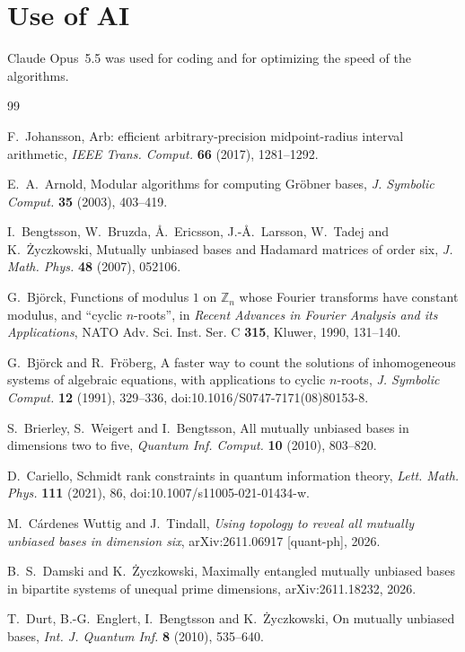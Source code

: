 \documentclass[11pt]{article}
\theoremstyle{definition}
\theoremstyle{remark}
\begin{document}
\section*{Use of AI}
Claude Opus~5.5 was used for coding and for optimizing the speed of the algorithms.

\begin{thebibliography}{99}

 F.~Johansson, Arb: efficient arbitrary-precision midpoint-radius interval arithmetic, \emph{IEEE Trans.
  Comput.} \textbf{66} (2017), 1281--1292.

 E.~A.~Arnold, Modular algorithms for computing Gr\"obner bases, \emph{J. Symbolic Comput.}
  \textbf{35} (2003), 403--419.

 I.~Bengtsson, W.~Bruzda, \AA.~Ericsson, J.-\AA.~Larsson, W.~Tadej and K.~\.Zyczkowski, Mutually
  unbiased bases and Hadamard matrices of order six, \emph{J. Math. Phys.} \textbf{48} (2007), 052106.

 G.~Bj\"orck, Functions of modulus $1$ on $\mathbb Z_n$ whose Fourier transforms have constant
  modulus, and ``cyclic $n$-roots'', in \emph{Recent Advances in Fourier Analysis and its Applications}, NATO Adv. Sci.
  Inst. Ser. C \textbf{315}, Kluwer, 1990, 131--140.

 G.~Bj\"orck and R.~Fr\"oberg, A faster way to count the solutions of inhomogeneous
  systems of algebraic equations, with applications to cyclic $n$-roots, \emph{J. Symbolic Comput.} \textbf{12}
  (1991), 329--336, doi:10.1016/S0747-7171(08)80153-8.

 S.~Brierley, S.~Weigert and I.~Bengtsson, All mutually unbiased bases in dimensions two to five,
  \emph{Quantum Inf. Comput.} \textbf{10} (2010), 803--820.

 D.~Cariello, Schmidt rank constraints in quantum information theory, \emph{Lett. Math. Phys.}
  \textbf{111} (2021), 86, doi:10.1007/s11005-021-01434-w.

 M.~Cárdenes Wuttig and J.~Tindall, \emph{Using topology to reveal all mutually unbiased bases in
  dimension six}, arXiv:2611.06917 [quant-ph], 2026.

 B.~S.~Damski and K.~\.Zyczkowski, Maximally entangled mutually unbiased bases in
  bipartite systems of unequal prime dimensions, arXiv:2611.18232, 2026.

 T.~Durt, B.-G.~Englert, I.~Bengtsson and K.~\.Zyczkowski, On mutually unbiased bases, \emph{Int. J.
  Quantum Inf.} \textbf{8} (2010), 535--640.


\end{thebibliography}
\end{document}

